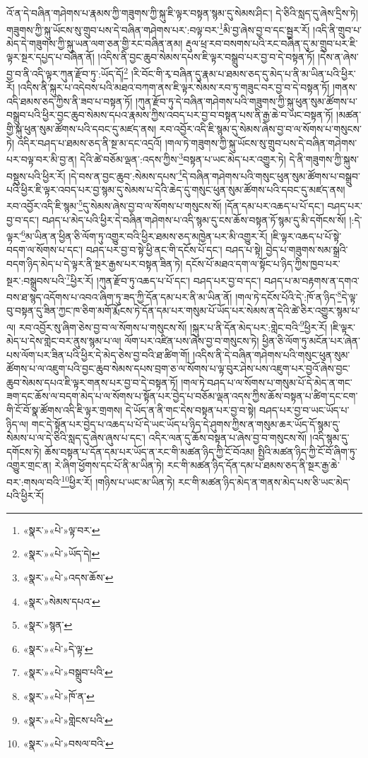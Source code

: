 འོ་ན་དེ་བཞིན་གཤེགས་པ་རྣམས་ཀྱི་གཟུགས་ཀྱི་སྐུ་ཇི་ལྟར་བསྟན་སྙམ་དུ་སེམས་ཤིང་། དེ་ཅིའི་སླད་དུ་ཞེས་དྲིས་ཏེ། གཟུགས་ཀྱི་སྐུ་ཡོངས་སུ་གྲུབ་པས་དེ་བཞིན་གཤེགས་པར་:བལྟ་བར་\footnote{«སྣར་»«པེ་»ལྟ་བར་}མི་བྱ་ཞེས་བྱ་བ་དང་སྦྱར་རོ། །འདི་ནི་གྲུབ་པ་མེད་དེ་གཟུགས་ཀྱི་སྐུ་ཡན་ལག་ཅན་གྱི་རང་བཞིན་ནམ། རྡུལ་ཕྲ་རབ་བསགས་པའི་རང་བཞིན་དུ་མ་གྲུབ་པར་ཇི་ལྟར་སྔར་དཔྱད་པ་བཞིན་ནོ། །འདིས་ནི་བྱང་ཆུབ་སེམས་དཔས་ཇི་ལྟར་བསྒྲུབ་པར་བྱ་བ་དེ་བསྟན་ཏོ། །དེས་ན་ཞེས་བྱ་བ་ནི་འདི་ལྟར་ཀུན་རྫོབ་ཏུ་:ཡོད་དོ།\footnote{«སྣར་»«པེ་»ཡོད་དེ།} །རི་བོང་གི་རྭ་བཞིན་དུ་རྣམ་པ་ཐམས་ཅད་དུ་མེད་པ་ནི་མ་ཡིན་པའི་ཕྱིར་རོ། །འདིས་ནི་སྐུར་པ་འདེབས་པའི་མཐའ་བཀག་ནས་ཇི་ལྟར་སེམས་རབ་ཏུ་གཟུང་བར་བྱ་བ་དེ་བསྟན་ཏོ། །གནས་འདི་ཐམས་ཅད་ཀྱིས་ནི་ཟབ་པ་བསྟན་ཏོ། །ཀུན་རྫོབ་ཏུ་དེ་བཞིན་གཤེགས་པའི་གཟུགས་ཀྱི་སྐུ་ཕུན་སུམ་ཚོགས་པ་བསྒྲུབ་པའི་ཕྱིར་བྱང་ཆུབ་སེམས་དཔའ་རྣམས་ཀྱིས་འབད་པར་བྱ་བ་བསྟན་པས་ནི་རྒྱ་ཆེ་བ་ཡང་བསྟན་ཏོ། །མཚན་གྱི་སྐུ་ཕུན་སུམ་ཚོགས་པའི་དབང་དུ་མཛད་ནས། རབ་འབྱོར་འདི་ཇི་སྙམ་དུ་སེམས་ཞེས་བྱ་བ་ལ་སོགས་པ་གསུངས་ཏེ། འདིར་བཤད་པ་ཐམས་ཅད་ནི་སྔ་མ་དང་འདྲའོ། །གལ་ཏེ་གཟུགས་ཀྱི་སྐུ་ཡོངས་སུ་གྲུབ་པས་དེ་བཞིན་གཤེགས་པར་བལྟ་བར་མི་བྱ་ན། དེའི་ཚེ་བཅོམ་ལྡན་:འདས་ཀྱིས་\footnote{«སྣར་»«པེ་»འདས་ཆོས་}བསྟན་པ་ཡང་མེད་པར་འགྱུར་ཏེ། དེ་ནི་གཟུགས་ཀྱི་སྐུས་བསྡུས་པའི་ཕྱིར་རོ། །དེ་བས་ན་བྱང་ཆུབ་:སེམས་དཔས་\footnote{«སྣར་»སེམས་དཔའ་}དེ་བཞིན་གཤེགས་པའི་གསུང་ཕུན་སུམ་ཚོགས་པ་བསྒྲུབ་པའི་ཕྱིར་ཇི་ལྟར་འབད་པར་བྱ་སྙམ་དུ་སེམས་པ་དེའི་ཆེད་དུ་གསུང་ཕུན་སུམ་ཚོགས་པའི་དབང་དུ་མཛད་ནས། རབ་འབྱོར་འདི་ཇི་སྙམ་\footnote{«སྣར་»སྙན་}དུ་སེམས་ཞེས་བྱ་བ་ལ་སོགས་པ་གསུངས་སོ། །དོན་དམ་པར་འཆད་པ་པོ་དང་། བཤད་པར་བྱ་བ་དང་། བཤད་པ་མེད་པའི་ཕྱིར་དེ་བཞིན་གཤེགས་པ་འདི་སྙམ་དུ་ངས་ཆོས་བསྟན་ཏོ་སྙམ་དུ་མི་དགོངས་སོ། །:དེ་ལྟར་\footnote{«སྣར་»«པེ་»དེ་ལྟ་}མ་ཡིན་ན་ཕྱིན་ཅི་ལོག་ཏུ་འགྱུར་བའི་ཕྱིར་ཐམས་ཅད་མཁྱེན་པར་མི་འགྱུར་རོ། །ཇི་ལྟར་འཆད་པ་པོ་སྟེ་བདག་ལ་སོགས་པ་དང་། བཤད་པར་བྱ་བ་སྟེ་ཕྱི་ནང་གི་དངོས་པོ་དང་། བཤད་པ་སྟེ། བྱེད་པ་གཟུགས་སམ་སྒྲའི་བདག་ཉིད་མེད་པ་དེ་ལྟར་ནི་སྔར་རྒྱས་པར་བསྟན་ཟིན་ཏེ། དངོས་པོ་མཐའ་དག་ལ་སྟོང་པ་ཉིད་ཀྱིས་ཁྱབ་པར་སྔར་:བསྒྲུབས་པའི་\footnote{«སྣར་»«པེ་»བསྒྲུབ་པའི་}ཕྱིར་རོ། །ཀུན་རྫོབ་ཏུ་འཆད་པ་པོ་དང་། བཤད་པར་བྱ་བ་དང་། བཤད་པ་མ་བརྟགས་ན་དགའ་བས་ཐ་སྙད་འདོགས་པ་འབའ་ཞིག་ཏུ་ཟད་ཀྱི་དོན་དམ་པར་ནི་མ་ཡིན་ནོ། །གལ་ཏེ་དངོས་པོའི་དེ་:ཁོ་ན་ཉིད་\footnote{«སྣར་»«པེ་»ཁོ་ན་}དེ་ལྟ་བུ་བསྟན་དུ་ཟིན་ཀྱང་ཁ་ཅིག་མགོ་རྨོངས་ཏེ་དོན་དམ་པར་གསུམ་པོ་ཡོད་པར་སེམས་ན་དེའི་ཚེ་ཅིར་འགྱུར་སྙམ་པ་ལ། རབ་འབྱོར་སུ་ཞིག་ཅེས་བྱ་བ་ལ་སོགས་པ་གསུངས་སོ། །སྐུར་པ་ནི་དོན་མེད་པར་:གླེང་བའི་\footnote{«སྣར་»«པེ་»གླེངས་པའི་}ཕྱིར་རོ། །ཇི་ལྟར་མེད་པ་དེས་གླེང་བར་ནུས་སྙམ་པ་ལ། ལོག་པར་འཛིན་པས་ཞེས་བྱ་བ་གསུངས་ཏེ། ཕྱིན་ཅི་ལོག་ཏུ་མངོན་པར་ཞེན་པས་ལོག་པར་ཟིན་པའི་ཕྱིར་དེ་མེད་ཅེས་བྱ་བའི་ཐ་ཚིག་གོ། །འདིས་ནི་དེ་བཞིན་གཤེགས་པའི་གསུང་ཕུན་སུམ་ཚོགས་པ་ལ་འཇུག་པའི་བྱང་ཆུབ་སེམས་དཔས་བྲག་ཅ་ལ་སོགས་པ་ལྟ་བུར་ཤེས་པས་འཇུག་པར་བྱའོ་ཞེས་བྱང་ཆུབ་སེམས་དཔའ་ཇི་ལྟར་གནས་པར་བྱ་བ་དེ་བསྟན་ཏོ། །གལ་ཏེ་བཤད་པ་ལ་སོགས་པ་གསུམ་པོ་དེ་མེད་ན་གང་ཟག་དང་ཆོས་ལ་བདག་མེད་པ་ལ་སོགས་པ་སྟོན་པར་བྱེད་པ་བཅོམ་ལྡན་འདས་ཀྱིས་ཆོས་བསྟན་པ་ཚིག་དང་ངག་གི་ངོ་བོ་སྣ་ཚོགས་འདི་ཇི་ལྟར་གྲགས། དེ་ཡོད་ན་ནི་གང་དེས་བསྟན་པར་བྱ་བ་སྟེ། བཤད་པར་བྱ་བ་ཡང་ཡོད་པ་ཉིད་ལ། གང་དེ་སྟོན་པར་བྱེད་པ་འཆད་པ་པོ་དེ་ཡང་ཡོད་པ་ཉིད་དེ་ཤུགས་ཀྱིས་ན་གསུམ་ཆར་ཡོད་དོ་སྙམ་དུ་སེམས་པ་ལ་དེ་ཅིའི་སླད་དུ་ཞེས་ཞུས་པ་དང་། འདིར་ལན་དུ་ཆོས་བསྟན་པ་ཞེས་བྱ་བ་གསུངས་སོ། །འདི་སྙམ་དུ་དགོངས་ཏེ། ཆོས་བསྟན་པ་དོན་དམ་པར་ཡོད་ན་རང་གི་མཚན་ཉིད་ཀྱི་ངོ་བོའམ། སྤྱིའི་མཚན་ཉིད་ཀྱི་ངོ་བོ་ཞིག་ཏུ་འགྱུར་གྲང་ན། རེ་ཞིག་ཕྱོགས་དང་པོ་ནི་མ་ཡིན་ཏེ། རང་གི་མཚན་ཉིད་དོན་དམ་པ་ཐམས་ཅད་ནི་སྔར་རྒྱ་ཆེ་བར་:གསལ་བའི་\footnote{«སྣར་»«པེ་»བསལ་བའི་}ཕྱིར་རོ། །གཉིས་པ་ཡང་མ་ཡིན་ཏེ། རང་གི་མཚན་ཉིད་མེད་ན་གནས་མེད་པས་ཅི་ཡང་མེད་པའི་ཕྱིར་རོ། 